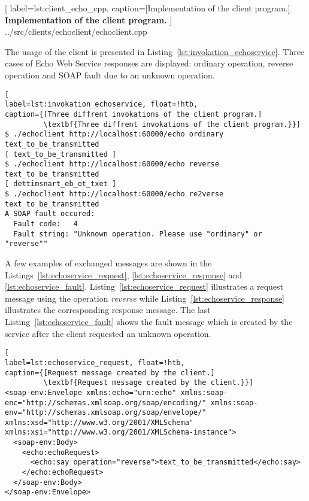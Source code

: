 
	[
	label=lst:client_echo_cpp,
	caption={[Implementation of the client program.]
	\textbf{Implementation of the client program.}}
	]
{../src/clients/echoclient/echoclient.cpp}


The usage of the client is presented in Listing~\ref{lst:invokation_echoservice}.
Three cases of Echo Web Service responses are displayed: ordinary operation, reverse operation and SOAP fault due to an unknown operation.


\begin{lstlisting}[
label=lst:invokation_echoservice, float=!htb,
caption={[Three diffrent invokations of the client program.]
         \textbf{Three diffrent invokations of the client program.}}]
$ ./echoclient http://localhost:60000/echo ordinary text_to_be_transmitted
[ text_to_be_transmitted ]
$ ./echoclient http://localhost:60000/echo reverse text_to_be_transmitted
[ dettimsnart_eb_ot_txet ]
$ ./echoclient http://localhost:60000/echo re2verse text_to_be_transmitted
A SOAP fault occured:
  Fault code:   4
  Fault string: "Unknown operation. Please use "ordinary" or "reverse""
\end{lstlisting}

A few examples of exchanged messages are shown in the Listings~\ref{lst:echoservice_request}, \ref{lst:echoservice_response} and \ref{lst:echoservice_fault}. Listing~\ref{lst:echoservice_request} illustrates a request message using the operation \textit{reverse} while Listing~\ref{lst:echoservice_response} illustrates the corresponding response message.
The last Listing~\ref{lst:echoservice_fault} shows the fault message which is created by the service after the client requested an unknown operation.

\begin{lstlisting}[
label=lst:echoservice_request, float=!htb,
caption={[Request message created by the client.]
         \textbf{Request message created by the client.}}]
<soap-env:Envelope xmlns:echo="urn:echo" xmlns:soap-enc="http://schemas.xmlsoap.org/soap/encoding/" xmlns:soap-env="http://schemas.xmlsoap.org/soap/envelope/" xmlns:xsd="http://www.w3.org/2001/XMLSchema" xmlns:xsi="http://www.w3.org/2001/XMLSchema-instance">
  <soap-env:Body>
    <echo:echoRequest>
      <echo:say operation="reverse">text_to_be_transmitted</echo:say>
    </echo:echoRequest>
  </soap-env:Body>
</soap-env:Envelope>
\end{lstlisting}



